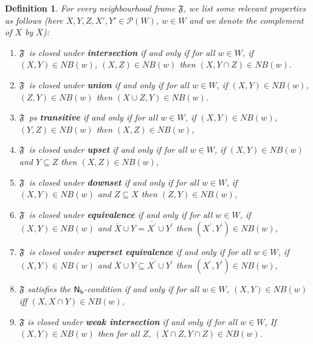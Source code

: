 \documentclass[12pt]{article}
\newtheorem{dfn}[thm]{Definition}
\newcommand{\fl}{\mbox{$\mathfrak{F}$}}
\begin{document}
\begin{dfn}
For every neighbourhood frame  $  \mathfrak{F} $, we list some relevant properties as follows (here $ X, Y, Z, X', Y' \in \mathcal{P}(W) $, $ w \in W $
and we denote the complement of $ X $ by $\overline{X} $):
\begin{enumerate}
\item[$ \bullet $] \fl \, is closed under \textbf{intersection} if and only if for all $ w \in W $, if $ (X, Y)\in N\!B(w) $, $ (X, Z)\in N\!B(w) $ then $ (X,  Y\cap Z) \in N\!B(w) $.
\item[$ \bullet $] \fl \, is closed under \textbf{union} if and only if for all $ w \in W $, if $ (X, Y)\in N\!B(w) $, $ (Z, Y)\in N\!B(w) $ then $ (X\cup Z,  Y) \in N\!B(w) $.
\item[$ \bullet $] \fl \, ps \textbf{transitive} if and only if for all $ w \in W $, if $ (X, Y)\in N\!B(w) $, $ (Y, Z)\in N\!B(w) $ then $ (X,  Z) \in N\!B(w) $,
\item[$ \bullet $] \fl \, is closed under \textbf{upset} if and only if for all $ w \in W $, if $ (X, Y)\in N\!B(w) $ and $ Y\subseteq Z $ then $ (X, Z) \in N\!B(w) $,
\item[$ \bullet $] \fl \, is closed under \textbf{downset} if and only if for all $ w \in W $, if $ (X, Y)\in N\!B(w) $ and $ Z\subseteq X $ then $ (Z, Y) \in N\!B(w) $,
\item[$ \bullet $] \fl \, is closed under \textbf{equivalence} if and only if for all $ w \in W $, if $ (X, Y)\in N\!B(w) $ and $ \overline{X} \cup Y =\overline{X^{'}} \cup Y^{'}$ then $ (X^{'}, Y^{'}) \in N\!B(w) $,
\item[$ \bullet $] \fl \, is closed under \textbf{superset equivalence} if and only if for all $ w \in W $, if $ (X, Y)\in N\!B(w) $ and $ \overline{X} \cup Y \subseteq \overline{X^{'}} \cup Y^{'}$ then $ (X^{'}, Y^{'}) \in N\!B(w) $,
\item[$ \bullet $]  $ \fl $ satisfies the $ {\sf N_{b} }$-condition if and only if for all $ w \in W $,
$(X, Y)\in N\!B(w)$  iff $ (X, X\cap Y) \in N\!B(w)$,
\item[$ \bullet $]  $ \fl $ is closed under \textbf{weak intersection} if and only if for all $ w \in W $,
If $(X, Y)\in N\!B(w)$ then for all $ Z$, $ (X \cap Z, Y\cap Z) \in N\!B(w)$.
\end{enumerate}
\end{dfn}
\end{document}

